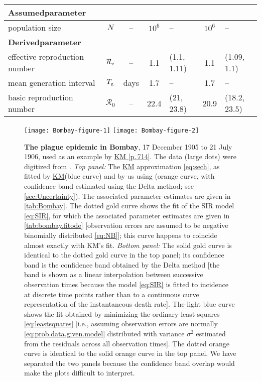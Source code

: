 \documentclass[]{interact}\usepackage[]{graphicx}\usepackage[]{xcolor}
\newenvironment{knitrout}{}{} %
\theoremstyle{plain}%
\theoremstyle{definition}
\theoremstyle{remark}
\newcommand{\R}{{\mathcal R}}
\newcommand{\Rn}{\R_0}
\newcommand{\Tg}{T_{\rm g}}
\newcommand{\Reff}{\R_{\rm e}}
\newcommand{\KM}{\protect\hyperlink{cite.KermMcKe27}{KM}\xspace}
\newcommand{\KMpage}[1]{\protect\hyperlink{cite.KermMcKe27}{KM [p.\,#1]}\xspace}
\newcommand{\code}[1]{\texttt{\detokenize{#1}}}
\newcommand{\KMcol}{blue\xspace}  %
\newcommand{\nlscol}{orange\xspace}  %
\newcommand{\FOolscol}{light blue\xspace} %
\newcommand{\FOnbcol}{gold\xspace}
\newcommand{\ie}{i.e., }
\begin{document}
\begin{table}
\begin{center}
\begin{tabular}{ m{3cm} | c | c | c m{1.8cm} | c m{1.8cm}}
    \bfseries Assumed\break parameter \\\hline
    population size & $N$ & -- & $10^6$ & -- & $10^6$ & -- \\
    \noalign{\vspace{10pt}}
    \bfseries Derived\break parameter \\\hline
      effective reproduction number & $\Reff$ & -- &
      1.1 &  (1.1, 1.11) & 1.1  &  (1.09, 1.1) \\
      mean generation interval & $\Tg$ & days &
      1.7 & -- & 1.7 & -- \\
    basic reproduction number & $\Rn$ & -- &
      22.4
      &  (21, 23.8) & 20.9 &  (18.2, 23.5)
  \end{tabular}
  \end{center}
\end{table}

\begin{figure}
\centering
\begin{knitrout}
\color{fgcolor}
\texttt{[image: Bombay-figure-1]} 
\texttt{[image: Bombay-figure-2]} 
\end{knitrout}
\caption{\textbf{The plague epidemic in Bombay}, 17 December 1905 to 21 July
  1906, used as an example by \KMpage{714}.  The data
  (large dots) were digitized from \citet[Table~IX, p.\,753]{jhyg1907}.
  \emph{Top panel:} The \KM
  approximation \eqref{eq:sech}, as fitted by \KM (\KMcol curve) and by us
  using \code{nls} (\nlscol curve, with confidence band estimated using the
  Delta method; see \cref{sec:Uncertainty}).  The associated parameter
  estimates are given in \cref{tab:Bombay}.  The dotted \FOnbcol curve
  shows the \code{fitode} fit of the SIR model \eqref{eq:SIR}, for
  which the associated parameter estimates are given in
  \cref{tab:bombay.fitode} [observation errors are assumed to be
    negative binomially distributed \eqref{eq:NB}]; this curve happens to
  coincide almost exactly with KM's fit.
  \emph{Bottom panel:} The solid \FOnbcol curve is identical to the
  dotted \FOnbcol curve in the top panel; its confidence band is the
  \code{fitode} confidence band obtained by the Delta method [the band
    is shown as a linear interpolation between successive observation
    times because the model \eqref{eq:SIR} is fitted to incidence at
    discrete time points rather than to a continuous curve
    representation of the instantaneous death rate].  The
  \FOolscol curve shows the \code{fitode} fit obtained by
  minimizing the ordinary least squares \eqref{eq:leastsquares} [\ie
    assuming observation errors are normally
    \eqref{eq:prob.data.given.model} distributed with variance
    $\sigma^2$ estimated from the residuals across all observation
    times].  The dotted \nlscol curve is identical to the solid \nlscol curve
  in the top panel.  We have separated the two panels because the
  confidence band overlap would make the plots difficult to
  interpret.}
\label{fig:Bombay}
\end{figure}
\end{document}

